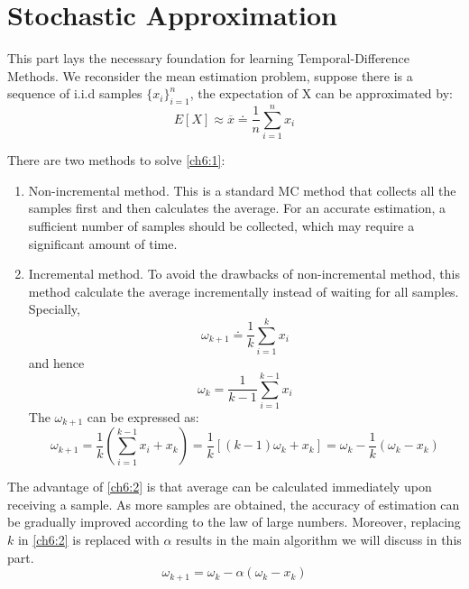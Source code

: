 \part{Stochastic Approximation} This part lays the necessary foundation for learning Temporal-Difference Methods. We
reconsider the mean estimation problem, suppose there is a sequence of i.i.d samples $\{x_{i}\}_{i=1}^{n}$, the
expectation of X can be approximated by:
\begin{equation}
  \label{ch6:1}
  E[X] \approx \overline{x} \doteq \frac{1}{n}\sum_{i=1}^{n}x_{i}
\end{equation}

There are two methods to solve \ref{ch6:1}:
\begin{enumerate}

  \item
        Non-incremental method. This is a standard MC method that collects all the samples first and then calculates the
        average. For an accurate estimation, a sufficient number of samples should be collected, which may require a
        significant amount of time.
  \item
        Incremental method. To avoid the drawbacks of non-incremental method, this method calculate the average incrementally
        instead of waiting for all samples. Specially,
        \begin{equation*}
          \omega_{k+1} \doteq \frac{1}{k}\sum_{i=1}^{k}x_{i}
        \end{equation*}
        and hence
        \begin{equation*}
          \omega_{k} = \frac{1}{k-1}\sum_{i=1}^{k-1}x_{i}
        \end{equation*}
        The $\omega_{k+1}$ can be expressed as:
        \begin{equation}
          \label{ch6:2}
          \omega_{k+1}=\frac{1}{k}(\sum_{i=1}^{k-1}x_{i}+x_{k}) = \frac{1}{k}\left[(k-1) \omega_{k}+x_{k}\right]=
          \omega_{k}-\frac{1}{k}(\omega_{k}-x_{k})
        \end{equation}

\end{enumerate}
The advantage of \ref{ch6:2} is that average can be calculated immediately upon receiving a sample. As more samples are
obtained, the accuracy of estimation can be gradually improved according to the law of large numbers. Moreover,
replacing $k$ in \ref{ch6:2} is replaced with $\alpha$ results in the main algorithm we will discuss in this part.
\begin{equation}
  \label{ch6:3}
  \omega_{k+1}=\omega_{k}-\alpha(\omega_{k}-x_{k})
\end{equation}

